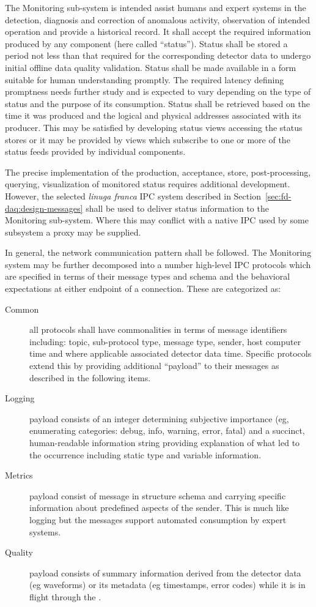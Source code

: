 The  Monitoring sub-system is intended assist humans and expert systems in the detection, diagnosis and correction of anomalous activity, observation of intended operation and provide a historical record.
It shall accept the required information produced by any  component (here called ``status'').
Status shall be stored a period not less than that required for the corresponding detector data to undergo initial offline data quality validation.
Status shall be made available in a form suitable for human understanding promptly. 
The required latency defining promptness needs further study and is expected to vary depending on the type of status and the purpose of its consumption.  
Status shall be retrieved based on the time it was produced and the logical and physical addresses associated with its producer.
This may be satisfied by developing status views accessing the status stores or it may be provided by views which subscribe to one or more of the status feeds provided by individual components.

The precise implementation of the production, acceptance, store, post-processing, querying, visualization of monitored status requires additional development. 
However, the selected \textit{linuga franca} IPC system described in Section~\ref{sec:fd-daq:design-messages} shall be used to deliver status information to the Monitoring sub-system. 
Where this may conflict with a native IPC used by some subsystem a proxy may be supplied. 

In general, the  network communication pattern shall be followed. 
The Monitoring system may be further decomposed into a number high-level IPC protocols which are specified in terms of their message types and schema and the behavioral expectations at either endpoint of a connection.
These are categorized as:


\begin{description}
\item[Common] all protocols shall have commonalities in terms of message identifiers including:  topic, sub-protocol type, message type, sender, host computer time and where applicable associated detector data time.  Specific protocols extend this by providing additional ``payload'' to their messages as described in the following items.
 
\item[Logging] payload consists of an integer determining subjective importance (eg, enumerating categories: debug, info, warning, error, fatal) and a succinct, human-readable information string providing explanation of what led to the occurrence including static type and variable information. 
\item[Metrics] payload consist of message in structure schema and carrying specific information about predefined aspects of the sender.  This is much like logging but the messages support automated consumption by expert systems.  
\item[Quality] payload consists of summary information derived from the detector data (eg waveforms) or its metadata (eg timestamps, error codes) while it is in flight through the .
\end{description}

